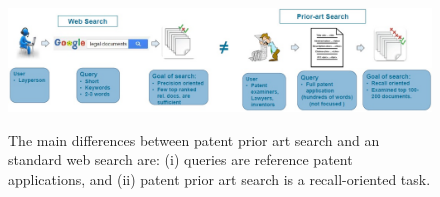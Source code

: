 
\begin{figure}[htpb]
   \centering
   \includegraphics[width=\textwidth,height=35mm]{figs/webprior.jpg}
   \caption{The main differences between patent prior art search and an standard web search are: (i) queries are reference patent
applications, and (ii) patent prior art search is a recall-oriented task.}  
   \label{fig:compareappr} 
\end{figure}
\FloatBarrier
